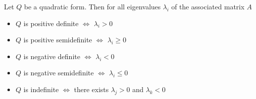 \documentclass[../main.tex]{subfiles}
\begin{document}
\begin{theorem}
    Let $Q$ be a quadratic form. Then for all eigenvalues $\lambda_i$ of the associated matrix $A$
    \begin{itemize}
        \item $Q$ is positive definite $\Leftrightarrow$ $\lambda_i > 0$
        \item $Q$ is positive semidefinite $\Leftrightarrow$ $\lambda_i \geq 0$
        \item $Q$ is negative definite $\Leftrightarrow$ $\lambda_i < 0$
        \item $Q$ is negative semidefinite $\Leftrightarrow$ $\lambda_i \leq 0$
        \item $Q$ is indefinite $\Leftrightarrow$ there exists $\lambda_j > 0$ and $\lambda_k < 0$
    \end{itemize}
\end{theorem}
\end{document}

